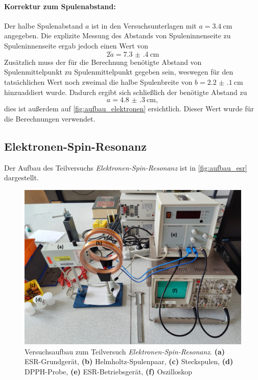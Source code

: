 \documentclass[ngerman]{scrartcl}
\begin{document}
\paragraph{Korrektur zum Spulenabstand:} Der halbe Spulenabstand $a$ ist in den Versuchsunterlagen mit $a = \SI{3.4}{\centi\meter}$ angegeben. Die explizite Messung des Abstands von Spuleninnenseite zu Spuleninnenseite ergab jedoch einen Wert von
\[2\tilde{a} = \SI{7.3(4)}{\centi\meter}\]
Zusätzlich muss der für die Berechnung benötigte Abstand von Spulenmittelpunkt zu Spulenmittelpunkt gegeben sein, weswegen für den tatsächlichen Wert noch zweimal die halbe Spulenbreite von $b = \SI{2.2(1)}{\centi\meter}$ hinzuaddiert wurde.
Dadurch ergibt sich schließlich der benötigte Abstand zu
\[a = \SI{4.8(3)}{\centi\meter},\]
dies ist außerdem auf \autoref{fig:aufbau_elektronen} ersichtlich. Dieser Wert wurde für die Berechnungen verwendet.



\subsection{Elektronen-Spin-Resonanz}
\label{subsec:anordnung_esr}

Der Aufbau des Teilversuchs \textit{Elektronen-Spin-Resonanz} ist in \autoref{fig:aufbau_esr} dargestellt.
%
\begin{figure}[H]
    \centering
    \begin{samepage}
        \includegraphics[width=0.8\linewidth]{fig/ESR_Aufbau_bearbeitet.png}
        \caption[Aufbau Elektronen-Spin-Resonanz]{Versuchsaufbau zum Teilversuch \textit{Elektronen-Spin-Resonanz}. \textbf{(a)} ESR-Grundgerät, \textbf{(b)} Helmholtz-Spulenpaar, \textbf{(c)} Steckspulen, \textbf{(d)} DPPH-Probe, \textbf{(e)} ESR-Betriebsgerät, \textbf{(f)} Oszilloskop}
        \label{fig:aufbau_esr}
    \end{samepage}
\end{figure}
\end{document}
